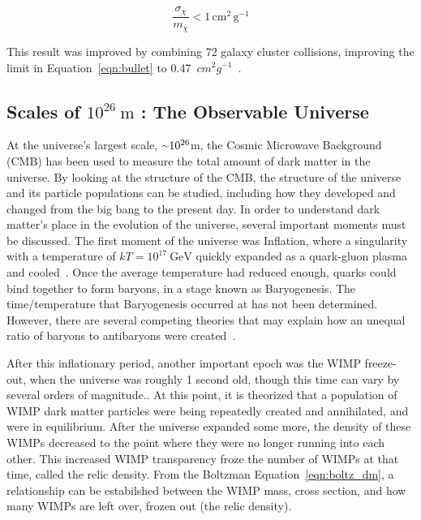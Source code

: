    \begin{equation}\label{eqn:bullet}
      \frac{\sigma_{\chi}}{m_{\chi}} < 1 \, \textrm{cm}^2 \, \textrm{g}^{-1}
    \end{equation}
    
    This result was improved by combining 72 galaxy cluster collisions, improving the limit in Equation~\ref{eqn:bullet} to \SI{0.47}{$cm^{2} g^{-1}$}~\cite{cluster_72}.


  \subsection{Scales of $10^{26}\:\text{m}$ : The Observable Universe}\label{dm_universe}
    At the universe's largest scale, $\nicetilde 10^{26}$m, the Cosmic Microwave Background (CMB) has been used to measure the total amount of dark matter in the universe.
    By looking at the structure of the CMB, the structure of the universe and its particle populations can be studied, including how they developed and changed from the big bang to the present day.
    In order to understand dark matter's place in the evolution of the universe, several important moments must be discussed.
    The first moment of the universe was Inflation, where a singularity with a temperature of $kT=10^{17}\:\textrm{GeV}$ quickly expanded as a quark-gluon plasma and cooled~\cite{inflation0,inflation1,inflation2,inflation3}.
    Once the average temperature had reduced enough, quarks could bind together to form baryons, in a stage known as Baryogenesis.
    The time/temperature that Baryogenesis occurred at has not been determined.
    However, there are several competing theories that may explain how an unequal ratio of baryons to antibaryons were created~\cite{baryogenesis1,baryogenesis2}.
    
    After this inflationary period, another important epoch was the WIMP freeze-out, when the universe was roughly 1 second old, though this time can vary by several orders of magnitude..
    At this point, it is theorized that a population of WIMP dark matter particles were being repeatedly created and annihilated, and were in equilibrium.
    After the universe expanded some more, the density of these WIMPs decreased to the point where they were no longer running into each other.
    This increased WIMP transparency froze the number of WIMPs at that time, called the relic density.
    From the Boltzman Equation~\ref{eqn:boltz_dm}, a relationship can be estabilshed between the WIMP mass, cross section, and how many WIMPs are left over, frozen out (the relic density).
    
